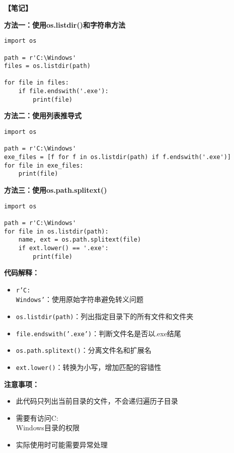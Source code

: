 \begin{mdframed}
  \textbf{\color{red}【笔记】}

  \textbf{方法一：使用os.listdir()和字符串方法}
  \begin{lstlisting}
import os

path = r'C:\Windows'
files = os.listdir(path)

for file in files:
    if file.endswith('.exe'):
        print(file)
  \end{lstlisting}

  \textbf{方法二：使用列表推导式}
  \begin{lstlisting}
import os

path = r'C:\Windows'
exe_files = [f for f in os.listdir(path) if f.endswith('.exe')]
for file in exe_files:
    print(file)
  \end{lstlisting}

  \textbf{方法三：使用os.path.splitext()}
  \begin{lstlisting}
import os

path = r'C:\Windows'
for file in os.listdir(path):
    name, ext = os.path.splitext(file)
    if ext.lower() == '.exe':
        print(file)
  \end{lstlisting}

  \textbf{代码解释：}
  \begin{itemize}
    \item \texttt{r'C:\\Windows'}：使用原始字符串避免转义问题
    \item \texttt{os.listdir(path)}：列出指定目录下的所有文件和文件夹
    \item \texttt{file.endswith('.exe')}：判断文件名是否以.exe结尾
    \item \texttt{os.path.splitext()}：分离文件名和扩展名
    \item \texttt{ext.lower()}：转换为小写，增加匹配的容错性
  \end{itemize}

  \textbf{注意事项：}
  \begin{itemize}
    \item 此代码只列出当前目录的文件，不会递归遍历子目录
    \item 需要有访问C:\\Windows目录的权限
    \item 实际使用时可能需要异常处理
  \end{itemize}

\end{mdframed}

